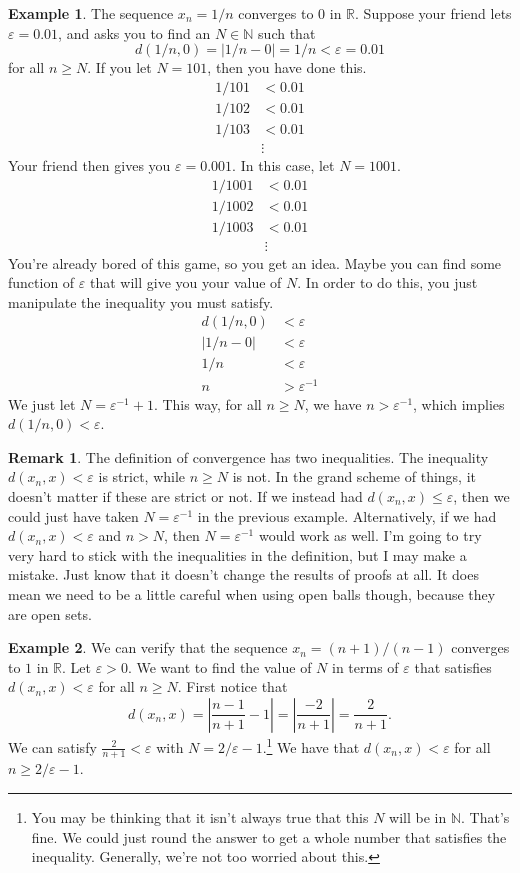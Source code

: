 \documentclass{article}
\newcommand{\N}{\mathbb{N}}
\newcommand{\R}{\mathbb{R}}
\theoremstyle{definition}
\newtheorem{example}{Example}[section]
\newtheorem{remark}{Remark}[section]
\begin{document}
	\begin{example}
		The sequence $ x_n=1/n $ converges to $ 0 $ in $ \R $. Suppose your friend lets $ \varepsilon=0.01 $, and asks you to find an $ N\in\N $ such that $$ d(1/n,0)=|1/n-0|=1/n<\varepsilon=0.01 $$ for all $ n\ge N $. If you let $ N=101 $, then you have done this. \begin{align*}
			1/101&<0.01\\1/102&<0.01\\1/103&<0.01\\&\vdots
		\end{align*} 
		Your friend then gives you $ \varepsilon=0.001 $. In this case, let $ N=1001 $.
		\begin{align*}
			1/1001&<0.01\\1/1002&<0.01\\1/1003&<0.01\\&\vdots
		\end{align*} 
		You're already bored of this game, so you get an idea. Maybe you can find some function of $ \varepsilon $ that will give you your value of $ N $. In order to do this, you just manipulate the inequality you must satisfy.
		\begin{align*}
			d(1/n,0)&<\varepsilon\\|1/n-0|&<\varepsilon\\1/n&<\varepsilon\\n&>\varepsilon^{-1}		
		\end{align*}
		We just let $ N=\varepsilon^{-1}+1 $. This way, for all $ n\ge N $, we have $ n>\varepsilon^{-1} $, which implies $ d(1/n,0)<\varepsilon $. 
	\end{example}
	\begin{remark}
		The definition of convergence has two inequalities. The inequality $ d(x_n,x)<\varepsilon $ is strict, while $ n\ge N $ is not. In the grand scheme of things, it doesn't matter if these are strict or not. If we instead had $ d(x_n,x)\le\varepsilon $, then we could just have taken $ N=\varepsilon^{-1} $ in the previous example. Alternatively, if we had $ d(x_n,x)<\varepsilon $ and $ n>N $, then $ N=\varepsilon^{-1} $ would work as well. I'm going to try very hard to stick with the inequalities in the definition, but I may make a mistake. Just know that it doesn't change the results of proofs at all. It does mean we need to be a little careful when using open balls though, because they are open sets.   
	\end{remark}
	\begin{example}
		We can verify that the sequence $ x_n=(n+1)/(n-1) $ converges to $ 1 $ in $ \R $. Let $ \varepsilon>0 $. We want to find the value of $ N $ in terms of $ \varepsilon $ that satisfies $ d(x_n,x)<\varepsilon $ for all $ n\ge N $. First notice that $$d(x_n,x)=\left\lvert\frac{n-1}{n+1}-1\right\rvert=\left\lvert\frac{-2}{n+1}\right\rvert=\frac{2}{n+1} .$$
		We can satisfy $ \frac{2}{n+1}<\varepsilon $ with $ N=2/\varepsilon-1 $.\footnote{You may be thinking that it isn't always true that this $ N $ will be in $ \N $. That's fine. We could just round the answer to get a whole number that satisfies the inequality. Generally, we're not too worried about this.} We have that $ d(x_n,x)<\varepsilon $ for all $ n\ge 2/\varepsilon-1 $. 
	\end{example}
\end{document}
